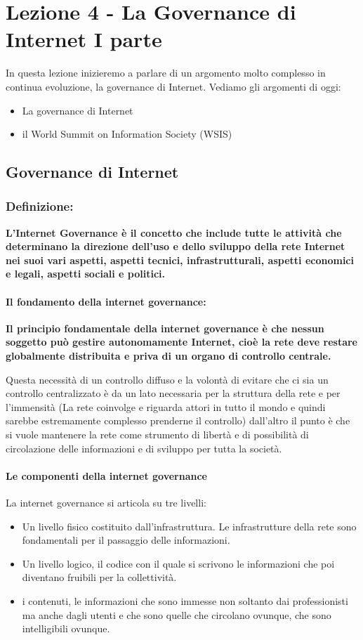 \chapter{Lezione 4 - La Governance di Internet I parte}

In questa lezione inizieremo a parlare di un argomento molto complesso in continua evoluzione, la governance di Internet. Vediamo gli argomenti di oggi:
\begin{itemize}
    \item La governance di Internet
    \item il World Summit on Information Society (WSIS)
\end{itemize}

\section{Governance di Internet}
\subsection{Definizione:}
\textbf{L'Internet Governance è il concetto che include tutte le attività che determinano la direzione dell'uso e dello sviluppo della rete Internet nei suoi vari aspetti, aspetti tecnici, infrastrutturali, aspetti economici e legali, aspetti sociali e politici.}

\subsubsection{Il fondamento della internet governance:}
\textbf{Il principio fondamentale della internet governance è che nessun soggetto può gestire autonomamente Internet, cioè la rete deve restare globalmente distribuita e priva di un organo di controllo centrale.} \par
Questa necessità di un controllo diffuso e la volontà di evitare che ci sia un controllo centralizzato è da un lato necessaria per la struttura della rete e per l'immensità (La rete coinvolge e riguarda attori in tutto il mondo e quindi sarebbe estremamente complesso prenderne il controllo) dall'altro il punto è che si vuole mantenere la rete come strumento di libertà e di possibilità di circolazione delle informazioni e di sviluppo per tutta la società.

\subsubsection{Le componenti della internet governance}
La internet governance si articola su tre livelli:
\begin{itemize}
    \item Un livello fisico costituito dall'infrastruttura. Le infrastrutture della rete sono fondamentali per il passaggio delle informazioni.
    \item Un livello logico, il codice con il quale si scrivono le informazioni che poi diventano fruibili per la collettività.
    \item i contenuti, le informazioni che sono immesse non soltanto dai professionisti ma anche dagli utenti e che sono quelle che circolano ovunque, che sono intelligibili ovunque.
\end{itemize}

